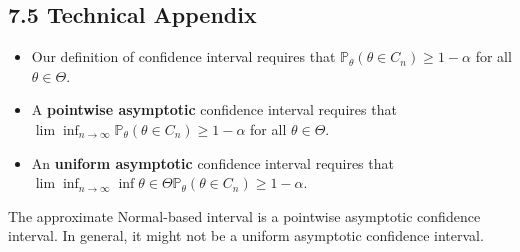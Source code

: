 \subsection*{7.5 Technical Appendix}

\begin{itemize}[tightlist]
\item
  Our definition of confidence interval requires that
  \(\mathbb{P}_\theta(\theta \in C_{n}) \geq 1 - \alpha\) for all
  \(\theta \in \Theta\).
\item
  A \textbf{pointwise asymptotic} confidence interval requires that
  \(\lim \inf_{n \rightarrow \infty} \mathbb{P}_\theta(\theta \in C_{n}) \geq 1 - \alpha\)
  for all \(\theta \in \Theta\).
\item
  An \textbf{uniform asymptotic} confidence interval requires that
  \(\lim \inf_{n \rightarrow \infty} \inf{\theta \in \Theta} \mathbb{P}_\theta(\theta \in C_{n}) \geq 1 - \alpha\).
\end{itemize}

The approximate Normal-based interval is a pointwise asymptotic
confidence interval. In general, it might not be a uniform asymptotic
confidence interval.

